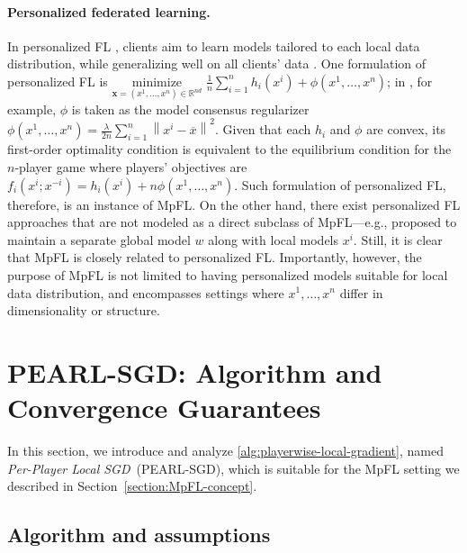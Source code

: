 \documentclass{article}
\newcommand{\algname}[1]{{\color{PineGreen}\sf  #1}\xspace}
\newcommand{\vx}{{\mathbf{x}}}
\newcommand{\reals}{\mathbb{R}}
\newcommand{\sqnorm}[1]{\left\| #1 \right\|^2}
\newcommand{\fullname}{Per-Player Local SGD}
\newcommand{\abbvname}{\algname{PEARL-SGD}}
\theoremstyle{plain}
\theoremstyle{remark}
\begin{document}
\paragraph{Personalized federated learning.}
In personalized FL \citep{FallahMokhtariOzdaglar2020_personalized, T.DinhTranNguyen2020_personalized, HanzelyHanzelyHorvathRichtarik2020_lower, hanzely2020federated, DengKamaniMahdavi2020_adaptive, TanYuCuiYang2023_personalized}, clients aim to learn models tailored to each local data distribution, 
while generalizing well on all clients' data \cite{HanzelyZhaokolar2023_personalized}.
One formulation of personalized FL is
$\underset{\vx = (x^1,\dots,x^n) \in \reals^{nd}}{\textrm{minimize}} \,\, \frac{1}{n} \sum_{i=1}^n h_i (x^i) + \phi(x^1,\dots,x^n)$; in  \cite{HanzelyHanzelyHorvathRichtarik2020_lower, HanzelyZhaokolar2023_personalized}, for example, $\phi$ is taken as the model consensus regularizer $\phi(x^1,\dots,x^n) = \frac{\lambda}{2n} \sum_{i=1}^n \sqnorm{x^i - \overline{x}}$.
Given that each $h_i$ and $\phi$ are convex, its first-order optimality condition is equivalent to the equilibrium condition for the $n$-player game where players' objectives are $f_i (x^i; x^{-i}) = h_i (x^i) + n\phi(x^1,\dots,x^n)$.
Such formulation of personalized FL, therefore, is an instance of MpFL.
On the other hand, there exist personalized FL approaches that are not modeled as a direct subclass of MpFL---e.g., \cite{FallahMokhtariOzdaglar2020_personalized, T.DinhTranNguyen2020_personalized} proposed to maintain a separate global model $w$ along with local models $x^i$.
Still, it is clear that MpFL is closely related to personalized FL.
Importantly, however, the purpose of MpFL is not limited to having personalized models suitable for local data distribution, and encompasses settings where $x^1,\dots,x^n$ differ in dimensionality or structure.

\section{\abbvname: Algorithm and Convergence Guarantees}
\label{section:algorithm}

In this section, we introduce and analyze \cref{alg:playerwise-local-gradient}, named \emph{\fullname}~(\abbvname), which is suitable for the MpFL setting we described in Section~\ref{section:MpFL-concept}.

\subsection{Algorithm and assumptions}
\end{document}

